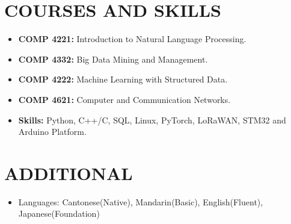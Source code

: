 \documentclass[10pt,a4paper,roman]{moderncv}        %
\begin{document}
\section{COURSES AND SKILLS}
\begin{itemize}
  \item \textbf{COMP 4221:} Introduction to Natural Language Processing.
  \vspace{0.2cm}
  \item \textbf{COMP 4332:} Big Data Mining and Management.
  \vspace{0.2cm}
  \item \textbf{COMP 4222:} Machine Learning with Structured Data.
  \vspace{0.2cm}
  \item \textbf{COMP 4621:} Computer and Communication Networks.
  \vspace{0.2cm}
  \item \textbf{Skills:} Python, C++/C, SQL, Linux, PyTorch, LoRaWAN, STM32 and Arduino Platform.
\end{itemize}

\section{ADDITIONAL}
\begin{itemize}
  \item Languages: Cantonese(Native), Mandarin(Basic), English(Fluent), Japanese(Foundation)
\end{itemize}
\end{document}
